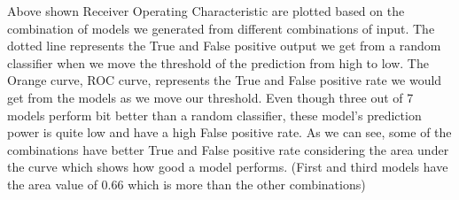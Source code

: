 \documentclass[9pt]{article}
\begin{document}
Above shown Receiver Operating Characteristic are plotted based on the combination of models we generated from different combinations of input. The dotted line represents the True and False positive output we get from a random classifier when we move the threshold of the prediction from high to low. The Orange curve, ROC curve, represents the True and False positive rate we would get from the models as we move our threshold. Even though three out of 7 models perform bit better than a random classifier, these model’s prediction power is quite low and have a high False positive rate. As we can see, some of the combinations have better True and False positive rate considering the area under the curve which shows how good a model performs. (First and third models have the area value of 0.66 which is more than the other combinations)
\end{document}
